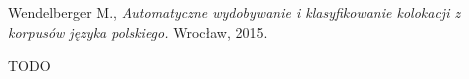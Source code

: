 \begin{thebibliography}{9}

Wendelberger M., 
\textit{Automatyczne wydobywanie i klasyfikowanie
kolokacji z korpusów języka polskiego.} 
Wrocław, 2015.


TODO


\end{thebibliography}